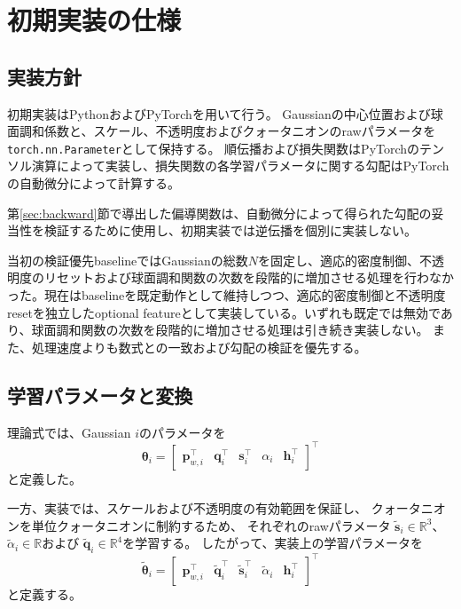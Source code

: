 \documentclass[dvipdfmx]{jlreq}
\begin{document}
\section{初期実装の仕様}
\label{sec:implementation_details}

\subsection{実装方針}
初期実装はPythonおよびPyTorchを用いて行う。
Gaussianの中心位置および球面調和係数と、スケール、不透明度およびクォータニオンのrawパラメータを\texttt{torch.nn.Parameter}として保持する。
順伝播および損失関数はPyTorchのテンソル演算によって実装し、損失関数の各学習パラメータに関する勾配はPyTorchの自動微分によって計算する。

第\ref{sec:backward}節で導出した偏導関数は、自動微分によって得られた勾配の妥当性を検証するために使用し、初期実装では逆伝播を個別に実装しない。

当初の検証優先baselineではGaussianの総数$N$を固定し、適応的密度制御、不透明度のリセットおよび球面調和関数の次数を段階的に増加させる処理を行わなかった。現在はbaselineを既定動作として維持しつつ、適応的密度制御と不透明度resetを独立したoptional featureとして実装している。いずれも既定では無効であり、球面調和関数の次数を段階的に増加させる処理は引き続き実装しない。
また、処理速度よりも数式との一致および勾配の検証を優先する。

\subsection{学習パラメータと変換}
\label{sec:parameter_transformation}
理論式では、Gaussian $i$のパラメータを
\begin{equation}
    \bm{\theta}_i = \begin{bmatrix} \bm{p}_{w,i}^{\top} & \bm{q}_i^{\top} & \bm{s}_i^{\top} & \alpha_i & \bm{h}_i^{\top} \end{bmatrix}^{\top}
\end{equation}
と定義した。

一方、実装では、スケールおよび不透明度の有効範囲を保証し、
クォータニオンを単位クォータニオンに制約するため、
それぞれのrawパラメータ
$\widetilde{\bm{s}}_i\in\mathbb{R}^3$、
$\widetilde{\alpha}_i\in\mathbb{R}$および
$\widetilde{\bm{q}}_i\in\mathbb{R}^4$を学習する。
したがって、実装上の学習パラメータを
\begin{equation}
    \widetilde{\bm{\theta}}_i = \begin{bmatrix} \bm{p}_{w,i}^{\top} & \widetilde{\bm{q}}_i^{\top} & \widetilde{\bm{s}}_i^{\top} & \widetilde{\alpha}_i & \bm{h}_i^{\top} \end{bmatrix}^{\top}
    \label{eq:raw_gaussian_parameters}
\end{equation}
と定義する。
\end{document}
